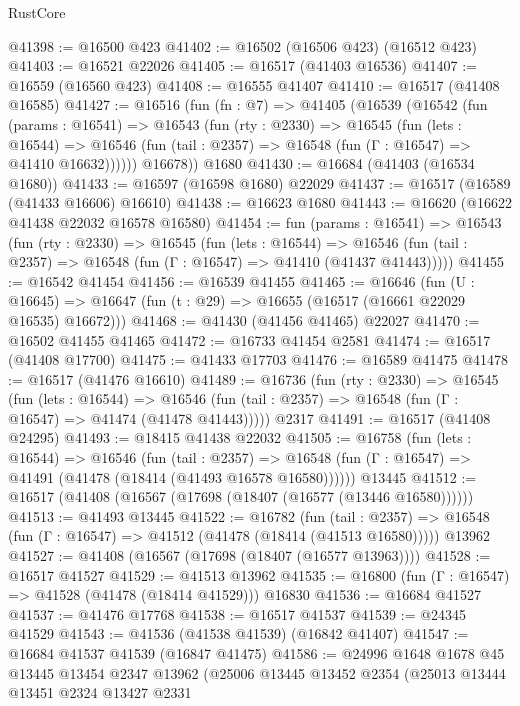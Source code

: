 \begin{lexlean}{RustCore}
\begin{coremodule}
@41398 := @16500 @423
@41402 := @16502 (@16506 @423) (@16512 @423)
@41403 := @16521 @22026
@41405 := @16517 (@41403 @16536)
@41407 := @16559 (@16560 @423)
@41408 := @16555 @41407
@41410 := @16517 (@41408 @16585)
@41427 := @16516
    (fun (fn : @7) =>
    @41405
      (@16539
        (@16542
          (fun (params : @16541) =>
          @16543
            (fun (rty : @2330) =>
            @16545
              (fun (lets : @16544) =>
              @16546 (fun (tail : @2357) => @16548 (fun (Γ : @16547) => @41410 @16632))))))
        @16678))
    @1680
@41430 := @16684 (@41403 (@16534 @1680))
@41433 := @16597 (@16598 @1680) @22029
@41437 := @16517 (@16589 (@41433 @16606) @16610)
@41438 := @16623 @1680
@41443 := @16620 (@16622 @41438 @22032 @16578 @16580)
@41454 := fun (params : @16541) =>
  @16543
    (fun (rty : @2330) =>
    @16545
      (fun (lets : @16544) =>
      @16546 (fun (tail : @2357) => @16548 (fun (Γ : @16547) => @41410 (@41437 @41443)))))
@41455 := @16542 @41454
@41456 := @16539 @41455
@41465 := @16646
    (fun (U : @16645) => @16647 (fun (t : @29) => @16655 (@16517 (@16661 @22029 @16535) @16672)))
@41468 := @41430 (@41456 @41465) @22027
@41470 := @16502 @41455 @41465
@41472 := @16733 @41454 @2581
@41474 := @16517 (@41408 @17700)
@41475 := @41433 @17703
@41476 := @16589 @41475
@41478 := @16517 (@41476 @16610)
@41489 := @16736
    (fun (rty : @2330) =>
    @16545
      (fun (lets : @16544) =>
      @16546 (fun (tail : @2357) => @16548 (fun (Γ : @16547) => @41474 (@41478 @41443)))))
    @2317
@41491 := @16517 (@41408 @24295)
@41493 := @18415 @41438 @22032
@41505 := @16758
    (fun (lets : @16544) =>
    @16546
      (fun (tail : @2357) =>
      @16548 (fun (Γ : @16547) => @41491 (@41478 (@18414 (@41493 @16578 @16580))))))
    @13445
@41512 := @16517 (@41408 (@16567 (@17698 (@18407 (@16577 (@13446 @16580))))))
@41513 := @41493 @13445
@41522 := @16782
    (fun (tail : @2357) => @16548 (fun (Γ : @16547) => @41512 (@41478 (@18414 (@41513 @16580)))))
    @13962
@41527 := @41408 (@16567 (@17698 (@18407 (@16577 @13963))))
@41528 := @16517 @41527
@41529 := @41513 @13962
@41535 := @16800 (fun (Γ : @16547) => @41528 (@41478 (@18414 @41529))) @16830
@41536 := @16684 @41527
@41537 := @41476 @17768
@41538 := @16517 @41537
@41539 := @24345 @41529
@41543 := @41536 (@41538 @41539) (@16842 @41407)
@41547 := @16684 @41537 @41539 (@16847 @41475)
@41586 := @24996
    @1648
    @1678
    @45
    @13445
    @13454
    @2347
    @13962
    (@25006
      @13445
      @13452
      @2354
      (@25013
        @13444
        @13451
        @2324
        @13427
        @2331

\end{coremodule}
\end{lexlean}
